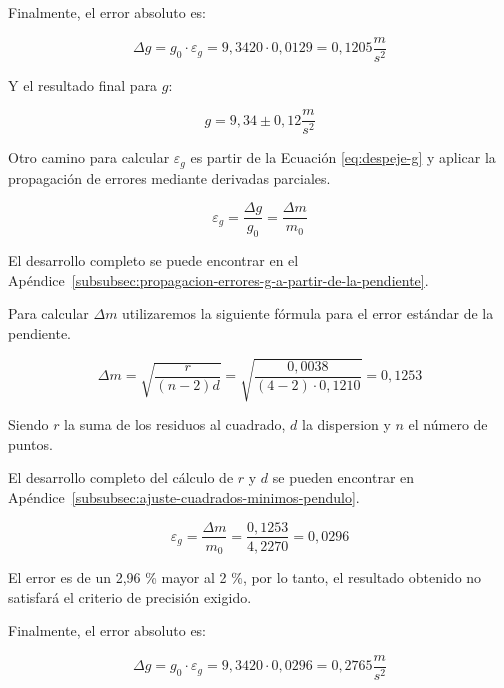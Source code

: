 Finalmente, el error absoluto es:

\begin{equation}
    \Delta g = g_0 \cdot \varepsilon_g = 9{,}3420 \cdot 0{,}0129 = 0{,}1205 \frac{m}{s^2}
    \label{eq:incerteza-absoluta-g-promedio}
\end{equation}

Y el resultado final para $g$:

\begin{equation}
    \boxed{g = 9{,}34 \pm 0{,}12 \frac{m}{s^2}}
    \label{eq:g-final}
\end{equation}

Otro camino para calcular $\varepsilon_g$ es partir de la Ecuación \ref{eq:despeje-g} y aplicar la propagación de errores mediante derivadas parciales.

\begin{equation}
    \varepsilon_g = \frac{\Delta g}{g_0} = \frac{\Delta m}{m_0}
    \label{eq:incerteza-absoluta-g-pendiente}
\end{equation}

El desarrollo completo se puede encontrar en el Apéndice~\ref{subsubsec:propagacion-errores-g-a-partir-de-la-pendiente}.

Para calcular $\Delta m$ utilizaremos la siguiente fórmula para el error estándar de la pendiente.

\begin{equation}
    \Delta m = \sqrt{ \frac{r}{(n-2)d} } = \sqrt{ \frac{0{,}0038}{(4-2) \cdot 0{,}1210} } = 0{,}1253
    \label{eq:incerteza-absoluta-m}
\end{equation}

Siendo $r$ la suma de los residuos al cuadrado, $d$ la dispersion y $n$ el número de puntos.

El desarrollo completo del cálculo de $r$ y $d$ se pueden encontrar en Apéndice~\ref{subsubsec:ajuste-cuadrados-minimos-pendulo}.

\begin{equation}
    \varepsilon_g = \frac{\Delta m}{m_0} = \frac{0{,}1253}{4{,}2270} = 0{,}0296
    \label{eq:error-relativo-g-pendiente}
\end{equation}

El error es de un 2,96 \% mayor al 2 \%, por lo tanto, el resultado obtenido no satisfará el criterio de precisión exigido.

Finalmente, el error absoluto es:

\begin{equation}
    \Delta g = g_0 \cdot \varepsilon_g = 9{,}3420 \cdot 0{,}0296 = 0{,}2765 \frac{m}{s^2}
    \label{eq:incerteza-absoluta-g-pendiente-resultado}
\end{equation}

